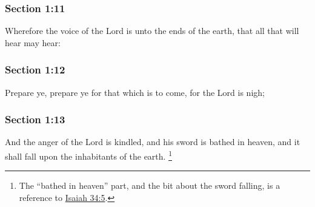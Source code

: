 
	\subsubsection{Section 1:11} %
		\label{DC1-11}

		Wherefore the voice of the Lord is unto the ends of the earth, that all that will hear may hear:


	\subsubsection{Section 1:12} %
		\label{DC1-12}

		Prepare ye, prepare ye for that which is to come, for the Lord is nigh;


	\subsubsection{Section 1:13} %
		\label{DC1-13}

		And the anger of the Lord is kindled, and his sword is bathed in heaven, and it shall fall upon the inhabitants of the earth.%
			\footnote{%
				The ``bathed in heaven'' part, and the bit about the sword falling, is a reference to \hyperref[ISAIAH-34-5]{Isaiah 34:5}.
				}

